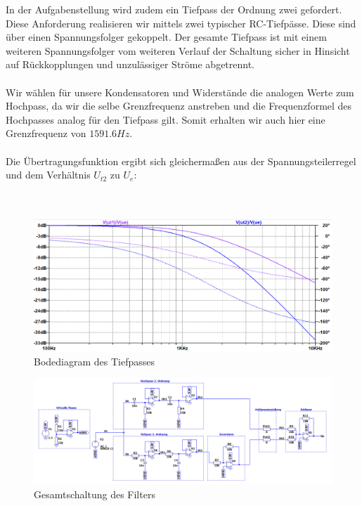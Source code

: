 In der Aufgabenstellung wird zudem ein Tiefpass der Ordnung zwei gefordert. Diese Anforderung realisieren wir mittels zwei typischer RC-Tiefpässe. Diese sind über einen Spannungsfolger gekoppelt. Der gesamte Tiefpass ist mit einem weiteren Spannungsfolger vom weiteren Verlauf der Schaltung sicher in Hinsicht auf Rückkopplungen und unzulässiger Ströme abgetrennt.
\\
\\
Wir wählen für unsere Kondensatoren und Widerstände die analogen Werte zum Hochpass, da wir die selbe Grenzfrequenz anstreben und die Frequenzformel des Hochpasses analog für den Tiefpass gilt. Somit erhalten wir auch hier eine Grenzfrequenz von $1591.6Hz$.
\\
\\
Die Übertragungsfunktion ergibt sich gleichermaßen aus der Spannungsteilerregel und dem Verhältnis $U_{t2}$ zu $U_{e}$:
\\
\\
\\
\begin{figure}[htb]
    \includegraphics[width=16cm]{./pictures/Tiefpass_Bode}
    \caption{Bodediagram des Tiefpasses}
    \label{fig:TiefpassBode}
\end{figure}

\newpage

\begin{figure}
    \includegraphics[width=24cm]{./pictures/Schaltung}
    \caption{Gesamtschaltung des Filters}
    \label{fig:Gesamtschaltung}
\end{figure}


